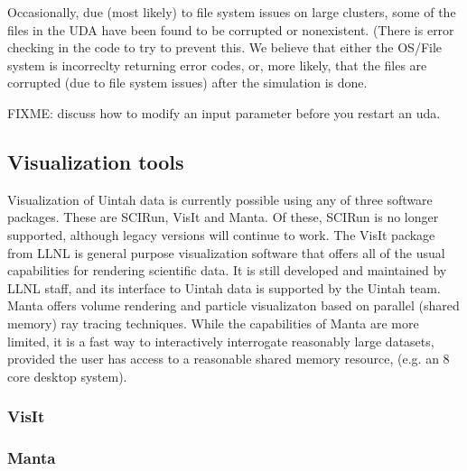 
Occasionally, due (most likely) to file system issues on large
clusters, some of the files in the UDA have been found to be corrupted
or nonexistent.  (There is error checking in the code to try to
prevent this.  We believe that either the OS/File system is
incorreclty returning error codes, or, more likely, that the files are
corrupted (due to file system issues) after the simulation is done.


FIXME: discuss how to modify an input parameter before you restart an uda.

\subsection{Visualization tools}

Visualization of Uintah data is currently possible using any of three
software packages.  These are SCIRun, VisIt and Manta.  Of these, SCIRun is
no longer supported, although legacy versions will continue to work.  The
VisIt package from LLNL is general purpose visualization software that offers
all of the usual capabilities for rendering scientific data.  It is still
developed and maintained by LLNL staff, and its interface to Uintah data is
supported by the Uintah team.  Manta offers volume rendering and particle
visualizaton based on parallel (shared memory) ray tracing techniques.
While the capabilities of Manta are more limited, it is a fast way to
interactively interrogate reasonably large datasets, provided the user has
access to a reasonable shared memory resource, (e.g. an 8 core desktop system).

\subsubsection{VisIt}

\subsubsection{Manta}

